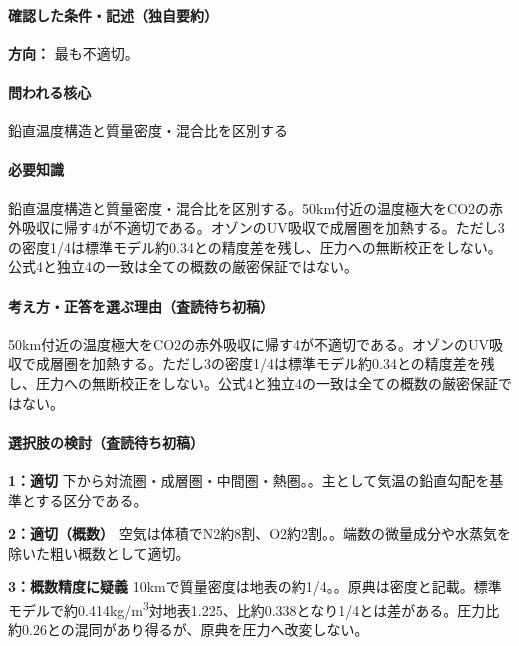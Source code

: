 \paragraph{確認した条件・記述（独自要約）}\mbox{}\par

\noindent\textbf{方向：} 最も不適切。\par

\paragraph{問われる核心} 鉛直温度構造と質量密度・混合比を区別する

\paragraph{必要知識} 鉛直温度構造と質量密度・混合比を区別する。50km付近の温度極大をCO2の赤外吸収に帰す4が不適切である。オゾンのUV吸収で成層圏を加熱する。ただし3の密度1/4は標準モデル約0.34との精度差を残し、圧力への無断校正をしない。公式4と独立4の一致は全ての概数の厳密保証ではない。

\paragraph{考え方・正答を選ぶ理由（査読待ち初稿）} 50km付近の温度極大をCO2の赤外吸収に帰す4が不適切である。オゾンのUV吸収で成層圏を加熱する。ただし3の密度1/4は標準モデル約0.34との精度差を残し、圧力への無断校正をしない。公式4と独立4の一致は全ての概数の厳密保証ではない。

\paragraph{選択肢の検討（査読待ち初稿）}\mbox{}\par

\noindent\textbf{1：適切} 下から対流圏・成層圏・中間圏・熱圏。。主として気温の鉛直勾配を基準とする区分である。\par

\noindent\textbf{2：適切（概数）} 空気は体積でN2約8割、O2約2割。。端数の微量成分や水蒸気を除いた粗い概数として適切。\par

\noindent\textbf{3：概数精度に疑義} 10kmで質量密度は地表の約1/4。。原典は密度と記載。標準モデルで約0.414kg/m\textsuperscript{3}対地表1.225、比約0.338となり1/4とは差がある。圧力比約0.26との混同があり得るが、原典を圧力へ改変しない。\par

